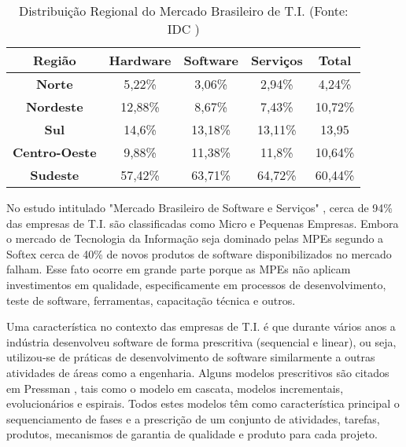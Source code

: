\begin{table}[H]
\centering
\caption{Distribuição Regional do Mercado Brasileiro de T.I. (Fonte: IDC \cite{abes-software2016})}
\label{tab:1.1}
\begin{tabular}{|c|c|c|c|c|}
\hline
\textbf{Região}       & \textbf{Hardware} & \textbf{Software} & \textbf{Serviços} & \textbf{Total} 
    \\ \hline
\textbf{Norte}        & 5,22\%            & 3,06\%            & 2,94\%            & 4,24\%         
    \\ \hline
\textbf{Nordeste}     & 12,88\%           & 8,67\%            & 7,43\%            & 10,72\%        
    \\ \hline
\textbf{Sul}          & 14,6\%            & 13,18\%           & 13,11\%           & 13,95          
    \\ \hline
\textbf{Centro-Oeste} & 9,88\%            & 11,38\%           & 11,8\%            & 10,64\%        
    \\ \hline
\textbf{Sudeste}      & 57,42\%           & 63,71\%           & 64,72\%           & 60,44\%        
    \\ \hline
\end{tabular}
\end{table}

No estudo intitulado "Mercado Brasileiro de Software e Serviços" \cite{abes-software2016}, cerca de 94\% das empresas de T.I. são classificadas como Micro e Pequenas Empresas. Embora o mercado de Tecnologia da Informação seja dominado pelas MPEs segundo a Softex \cite{GuiaMPTbr} cerca de 40\% de novos produtos de software disponibilizados no mercado falham. Esse fato ocorre em grande parte porque as MPEs não aplicam investimentos em qualidade, especificamente em processos de desenvolvimento, teste de software, ferramentas, capacitação técnica e outros.

Uma característica no contexto das empresas de T.I. é que durante vários anos a indústria desenvolveu software de forma prescritiva (sequencial e linear), ou seja, utilizou-se de práticas de desenvolvimento de software similarmente a outras atividades de áreas como a engenharia. Alguns modelos prescritivos são citados em Pressman \cite{PRESSMAN2011}, tais como o modelo em cascata, modelos incrementais, evolucionários e espirais. Todos estes modelos têm como característica principal o sequenciamento de fases e a prescrição de um conjunto de atividades, tarefas, produtos, mecanismos de garantia de qualidade e produto para cada projeto. 

